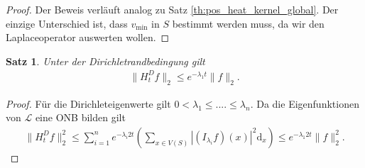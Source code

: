 \documentclass[headsepline,11pt]{scrbook}
\newtheorem{thm}[lem]{Satz}
\theoremstyle{definition}
\begin{document}
\begin{proof}
Der Beweis verl\"auft analog zu Satz \ref{th:pos_heat_kernel_global}. 
Der einzige Unterschied ist, dass $ v_\mathrm{min} $ in $ S $ bestimmt werden muss, da wir den Laplaceoperator auswerten wollen.


\end{proof}

\begin{thm}
	Unter der Dirichletrandbedingung gilt
	\begin{align*}
	\| H_t^D f \|_2  \leq e^{- \lambda_1 t} \|f \|_2.
	\end{align*}
\end{thm}
\begin{proof}
	F\"ur die Dirichleteigenwerte gilt $ 0 < \lambda_1 \leq ....  \leq \lambda_n$.
	Da die Eigenfunktionen von $ \mathcal{L} $ eine ONB bilden gilt
	\begin{align*}
	\| H_t^D f \|_2^2
	\leq  
	\sum \limits_{i=1}^n 
	e^{-\lambda_i 2t}
	\left(\sum \limits_{x \in V(S)}  |(I_{\lambda_i} f) (x)|^2 \mathrm{d}_x\right)
	\leq 
	e^{-\lambda_1 2t} \| f \|_2^2.
	\end{align*}
\end{proof}
\end{document}
